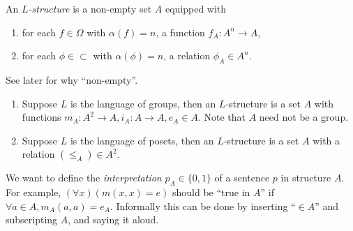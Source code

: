 \documentclass[a4paper]{article}
\begin{document}
\begin{definition}[\(L\)-structure]
  An \emph{\(L\)-structure} is a non-empty set \(A\) equipped with
  \begin{enumerate}
  \item for each \(f \in \Omega\) with \(\alpha(f) = n\), a function \(f_A: A^n \to A\),
  \item for each \(\phi \in \subset\) with \(\alpha(\phi) = n\), a relation \(\phi_A \in A^n\).
  \end{enumerate}
\end{definition}

See later for why ``non-empty''.

\begin{eg}\leavevmode
  \begin{enumerate}
  \item Suppose \(L\) is the language of groups, then an \(L\)-structure is a set \(A\) with functions \(m_A: A^2 \to A, i_A: A \to A, e_A \in A\). Note that \(A\) need not be a group.
  \item Suppose \(L\) is the language of posets, then an \(L\)-structure is a set \(A\) with a relation \((\leq_A) \in A^2\).
  \end{enumerate}
\end{eg}

We want to define the \emph{interpretation} \(p_A \in \{0, 1\}\) of a sentence \(p\) in structure \(A\). For example, \((\forall x) (m(x, x) = e)\) should be ``true in \(A\)'' if \(\forall a \in A, m_A(a, a) = e_A\). Informally this can be done by inserting ``\(\in A\)'' and subscripting \(A\), and saying it aloud.
\end{document}
